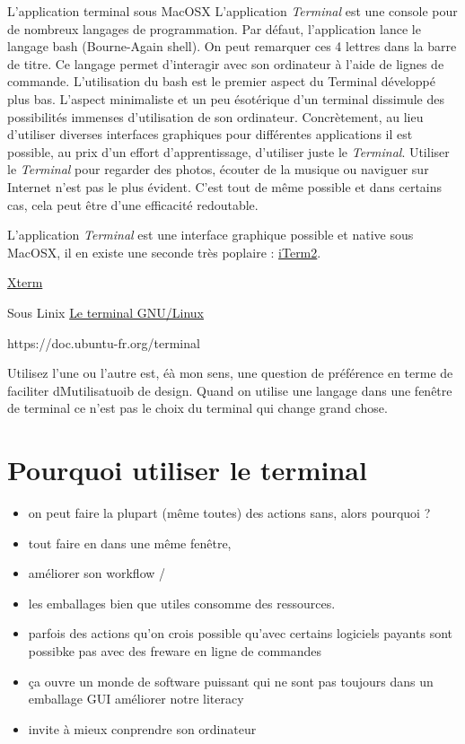 L'application terminal sous MacOSX L'application \emph{Terminal} est une
console pour de nombreux langages de programmation. Par défaut,
l'application lance le langage bash (Bourne-Again shell). On peut
remarquer ces 4 lettres dans la barre de titre. Ce langage permet
d'interagir avec son ordinateur à l'aide de lignes de commande.
L'utilisation du bash est le premier aspect du Terminal développé plus
bas. L'aspect minimaliste et un peu ésotérique d'un terminal dissimule
des possibilités immenses d'utilisation de son ordinateur. Concrètement,
au lieu d'utiliser diverses interfaces graphiques pour différentes
applications il est possible, au prix d'un effort d'apprentissage,
d'utiliser juste le \emph{Terminal}. Utiliser le \emph{Terminal} pour
regarder des photos, écouter de la musique ou naviguer sur Internet
n'est pas le plus évident. C'est tout de même possible et dans certains
cas, cela peut être d'une efficacité redoutable.

L'application \emph{Terminal} est une interface graphique possible et
native sous MacOSX, il en existe une seconde très poplaire :
\href{https://www.iterm2.com/index.html}{iTerm2}.

\href{http://invisible-island.net/xterm/xterm.html}{Xterm}

Sous Linix \href{https://doc.ubuntu-fr.org/terminal}{Le terminal
GNU/Linux}

https://doc.ubuntu-fr.org/terminal

Utilisez l'une ou l'autre est, éà mon sens, une question de préférence
en terme de faciliter dMutilisatuoib de design. Quand on utilise une
langage dans une fenêtre de terminal ce n'est pas le choix du terminal
qui change grand chose.

\section{Pourquoi utiliser le
terminal}\label{pourquoi-utiliser-le-terminal}

\begin{itemize}
\tightlist
\item
  on peut faire la plupart (même toutes) des actions sans, alors
  pourquoi ?
\item
  tout faire en dans une même fenêtre,
\item
  améliorer son workflow /
\item
  les emballages bien que utiles consomme des ressources.
\item
  parfois des actions qu'on crois possible qu'avec certains logiciels
  payants sont possibke pas avec des freware en ligne de commandes
\item
  ça ouvre un monde de software puissant qui ne sont pas toujours dans
  un emballage GUI améliorer notre literacy
\item
  invite à mieux conprendre son ordinateur
\end{itemize}

